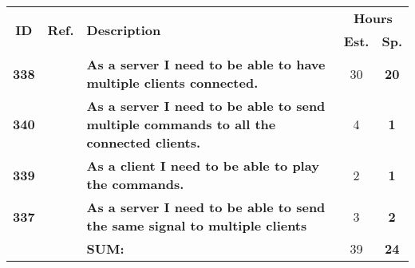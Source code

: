   \label{tab:sprint2stories}
 \def\arraystretch{1.25}
 
\begin{longtable}{ccXcc}
\toprule[0.5mm]
\multirow{2}{*}{\textbf{ID}} &
\multirow{2}{*}{\textbf{Ref.}} & \multirow{2}{*}{\textbf{Description}} & \multicolumn{2}{c}{\textbf{Hours}} \\
 				& & & \textbf{Est.} & \textbf{Sp.} \\ 				
\midrule

\textbf{338} 	& {?} & {\bf As a server I need to be able to have multiple clients connected.} 							& 	30	& \textbf{20} \\
	
\textbf{340} 	& {?} & {\bf As a server I need to be able to send multiple commands to all the connected clients.} 		& 	4	& \textbf{1} \\

\textbf{339} 	& {?} & {\bf  As a client I need to be able to play the commands.}										& 	2	& \textbf{1} \\
\textbf{337} 	& {?} & {\bf  As a server I need to be able to send the same signal to multiple clients} 				& 	3	& \textbf{2} \\		
				
\hline
				&& \textbf{SUM:}		&		39	& \textbf{24}\\																			
\bottomrule[0.5mm]
\end{longtable}